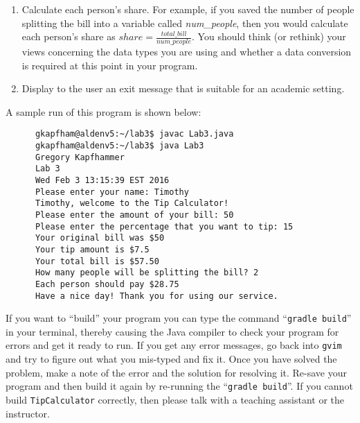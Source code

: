 \documentclass[11pt]{article}
\newcommand{\mainprogram}{\lstinline{TipCalculator}}
\newcommand{\gradlebuild}{\command{gradle build}}
\newcommand{\command}[1]{``\lstinline{#1}''}
\newcommand{\program}[1]{\lstinline{#1}}
\newcommand{\option}[1]{``{#1}''}
\newcommand{\step}[1]{``{#1}''}
\begin{document}
\begin{enumerate}
\item Calculate each person's share. For example, if you saved the number of people splitting the bill into a variable
  called {\em num\_people}, then you would calculate each person's share as $share = \frac{total\_bill}{num\_people}$. You should think (or rethink) your views concerning the data types you are using and whether a data
    conversion is required at this point in your program.

\item Display to the user an exit message that is suitable for an academic setting.

\end{enumerate}

\noindent
A sample run of this program is shown below:

\begin{verbatim}
      gkapfham@aldenv5:~/lab3$ javac Lab3.java
      gkapfham@aldenv5:~/lab3$ java Lab3
      Gregory Kapfhammer
      Lab 3
      Wed Feb 3 13:15:39 EST 2016
      Please enter your name: Timothy
      Timothy, welcome to the Tip Calculator!
      Please enter the amount of your bill: 50
      Please enter the percentage that you want to tip: 15
      Your original bill was $50
      Your tip amount is $7.5
      Your total bill is $57.50
      How many people will be splitting the bill? 2
      Each person should pay $28.75
      Have a nice day! Thank you for using our service.

\end{verbatim}




If you want to \step{build} your program you can type the command \gradlebuild{} in your terminal, thereby causing the
Java compiler to check your program for errors and get it ready to run. If you get any error messages, go back into
\program{gvim} and try to figure out what you mis-typed and fix it. Once you have solved the problem, make a note of the
error and the solution for resolving it. Re-save your program and then build it again by re-running the \gradlebuild{}.
If you cannot build \mainprogram{} correctly, then please talk with a teaching assistant or the instructor.
\end{document}
